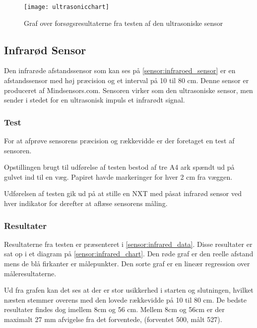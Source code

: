 \begin{figure}[h]
\centering
\texttt{[image: ultrasonicchart]}
\caption{Graf over forsøgsresultaterne fra testen af den ultrasoniske sensor}
\label{sensor:ultrasonic_resultat_diagram}
\end{figure}



\subsection{Infrarød Sensor}
Den infrarøde afstandssensor som kan ses på \cref{sensor:infraroed_sensor} er en afstandssensor med høj præcision og et interval på 10 til 80 cm. 
Denne sensor er produceret af Mindsensors.com. 
Sensoren virker som den ultrasoniske sensor, men sender i stedet for en ultrasonisk impuls et infrarødt signal. 

\subsubsection{Test}
For at afprøve sensorens præcision og rækkevidde er der foretaget en test af sensoren.

Opstillingen brugt til udførelse af testen bestod af tre A4 ark spændt ud på gulvet ind til en væg. 
Papiret havde markeringer for hver 2 cm fra væggen.

Udførelsen af testen gik ud på at stille en NXT med påsat infrarød sensor ved hver indikator for derefter at aflæse sensorens måling.

\subsubsection{Resultater}

Resultaterne fra testen er præsenteret i \cref{sensor:infrared_data}. 
Disse resultater er sat op i et diagram på \cref{sensor:infrared_chart}.
Den røde graf er den reelle afstand mens de blå firkanter er målepunkter.
Den sorte graf er en lineær regression over måleresultaterne.

Ud fra grafen kan det ses at der er stor usikkerhed i starten og slutningen, hvilket næsten stemmer overens med den lovede rækkevidde på 10 til 80 cm.
De bedste resultater findes dog imellem 8cm og 56 cm. 
Mellem 8cm og 56cm er der maximalt 27 mm afvigelse fra det forventede, (forventet 500, målt 527).
\paragraph{}

